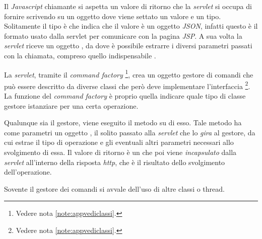 \documentclass[tesi.tex]{subfiles}
\begin{document}
Il \emph{Javascript} chiamante si aspetta un valore di ritorno che la
\emph{servlet} si occupa di fornire scrivendo su un oggetto
 dove viene settato un valore e un tipo.
Solitamente il tipo \`e  che
indica che il valore \`e un oggetto \emph{JSON}, infatti questo \`e il
formato usato dalla servlet per comunicare con la pagina \emph{JSP}. A sua volta la
\emph{servlet} riceve un oggetto , da dove
\`e possibile estrarre i diversi parametri passati con la chiamata,
compreso quello indispensabile .

La \emph{servlet}, tramite il \emph{command factory}
\footnote{Vedere nota
  \ref{note:appvediclassi}.}, crea un oggetto gestore di comandi che pu\`o
essere descritto da diverse classi che per\`o deve implementare
l'interfaccia \footnote{Vedere nota
  \ref{note:appvediclassi}.}. La funzione del \emph{command factory} \`e
proprio quella indicare quale tipo di classe gestore istanziare per
una certa operazione.

Qualunque sia il gestore, viene eseguito il metodo  su
di esso. Tale metodo ha come parametri un oggetto
, il solito passato alla \emph{servlet} che
lo \emph{gira} al gestore, da cui estrae il tipo di operazione e gli
eventuali altri parametri necessari allo svolgimento di essa. Il
valore di ritorno \`e un  che poi viene
\emph{incapsulato} dalla \emph{servlet} all'interno della risposta
\emph{http}, che \`e il risultato dello svolgimento dell'operazione.

Sovente il gestore dei comandi si avvale dell'uso di altre classi o
thread.
\end{document}
